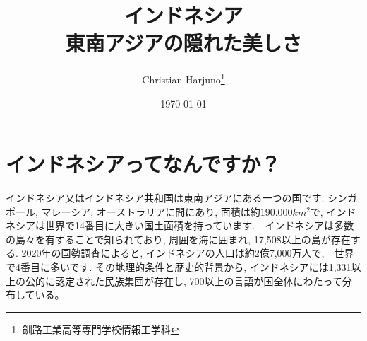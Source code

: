\documentclass[a4j, twocolumn]{jarticle}
\begin{document}
  \title{インドネシア \\\large 東南アジアの隠れた美しさ}
  \author{Christian Harjuno\thanks{釧路工業高等専門学校情報工学科}}
  \date{\today}
  \maketitle
  \section{インドネシアってなんですか？}
  インドネシア又はインドネシア共和国は東南アジアにある一つの国です. シンガポール, マレーシア, オーストラリアに間にあり, 面積は約$190.000km^2$で, インドネシアは世界で14番目に大きい国土面積を持っています.　インドネシアは多数の島々を有することで知られており, 周囲を海に囲まれ, 17,508以上の島が存在する. \cite{ANDREFOUET2022104848}
  2020年の国勢調査によると, インドネシアの人口は約2億7,000万人で,　世界で4番目に多いです.\cite{unstats2023} その地理的条件と歴史的背景から, インドネシアには1,331以上の公的に認定された民族集団が存在し, 700以上の言語が国全体にわたって分布している。


  
  
\end{document}
